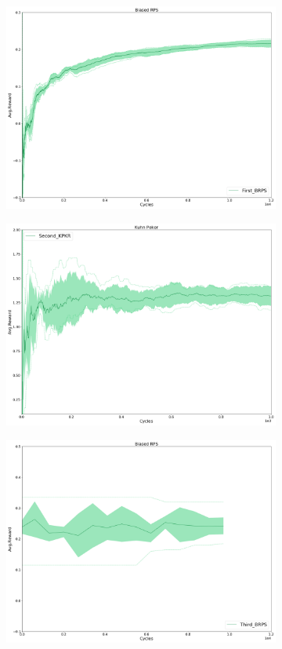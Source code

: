 \documentclass{article}
\theoremstyle{definition}
\newtheorem{primary statistics}[definition]{Primary Statistics}
\newtheorem{auxiliary statistics}[definition]{Auxiliary Statistics}
\begin{document}
 \begin{figure}[h]
 \centering
    \includegraphics[width=9.1cm]{First_BRPS}
\end{figure}

\begin{figure}[h]
 \centering
    \includegraphics[width=9.1cm]{Second_KPKR}
\end{figure}

\begin{figure}[h]
 \centering
    \includegraphics[width=9.1cm]{Third_BRPS}
\end{figure}
\end{document}
